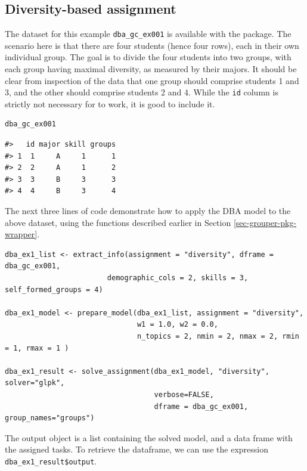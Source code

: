 \subsection{Diversity-based assignment}\label{diversity-based-assignment-1}

The dataset for this example \texttt{dba\_gc\_ex001} is available with the package. The
scenario here is that there are four students (hence four rows), each in their
own individual group. The goal is to divide the four students into two groups,
with each group having maximal diversity, as measured by their majors. It
should be clear from inspection of the data that one group should comprise
students 1 and 3, and the other should comprise students 2 and 4. While the
\texttt{id} column is strictly not necessary for  to work, it is good
to include it.

\begin{verbatim}
dba_gc_ex001
\end{verbatim}

\begin{verbatim}
#>   id major skill groups
#> 1  1     A     1      1
#> 2  2     A     1      2
#> 3  3     B     3      3
#> 4  4     B     3      4
\end{verbatim}

The next three lines of code demonstrate how to apply the DBA model to the above
dataset, using the functions described earlier in Section \ref{sec-grouper-pkg-wrapper}.

\begin{verbatim}
dba_ex1_list <- extract_info(assignment = "diversity", dframe = dba_gc_ex001, 
                        demographic_cols = 2, skills = 3, self_formed_groups = 4)

dba_ex1_model <- prepare_model(dba_ex1_list, assignment = "diversity", 
                               w1 = 1.0, w2 = 0.0, 
                               n_topics = 2, nmin = 2, nmax = 2, rmin = 1, rmax = 1 )

dba_ex1_result <- solve_assignment(dba_ex1_model, "diversity", solver="glpk", 
                                   verbose=FALSE, 
                                   dframe = dba_gc_ex001,  group_names="groups")
\end{verbatim}

The output object is a list containing the solved model, and a data frame with the
assigned tasks. To retrieve the dataframe, we can use the expression
\texttt{dba\_ex1\_result\$output}.

